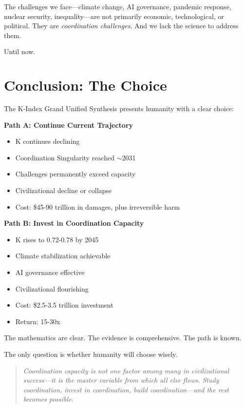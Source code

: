 \documentclass[12pt,letterpaper]{article}
\begin{document}
The challenges we face---climate change, AI governance, pandemic response, nuclear security, inequality---are not primarily economic, technological, or political. They are \textit{coordination challenges}. And we lack the science to address them.

Until now.

\section{Conclusion: The Choice}

The K-Index Grand Unified Synthesis presents humanity with a clear choice:

\textbf{Path A: Continue Current Trajectory}
\begin{itemize}
    \item K continues declining
    \item Coordination Singularity reached $\sim$2031
    \item Challenges permanently exceed capacity
    \item Civilizational decline or collapse
    \item Cost: \$45-90 trillion in damages, plus irreversible harm
\end{itemize}

\textbf{Path B: Invest in Coordination Capacity}
\begin{itemize}
    \item K rises to 0.72-0.78 by 2045
    \item Climate stabilization achievable
    \item AI governance effective
    \item Civilizational flourishing
    \item Cost: \$2.5-3.5 trillion investment
    \item Return: 15-30x
\end{itemize}

The mathematics are clear. The evidence is comprehensive. The path is known.

The only question is whether humanity will choose wisely.

\begin{quote}
\textit{Coordination capacity is not one factor among many in civilizational success---it is the master variable from which all else flows. Study coordination, invest in coordination, build coordination---and the rest becomes possible.}
\end{quote}
\end{document}

